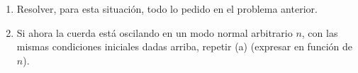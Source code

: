 \documentclass[11pt,spanish,a4paper]{article}
\begin{document}
\begin{enumerate}
\begin{enumerate}
\item Resolver, para esta situación, todo lo pedido en el problema anterior. 
\item Si ahora la cuerda está oscilando en un modo normal arbitrario $n$,
con las mismas condiciones iniciales dadas arriba, repetir (a) (expresar
en función de $n$). \end{enumerate}
\end{enumerate}
\end{document}
